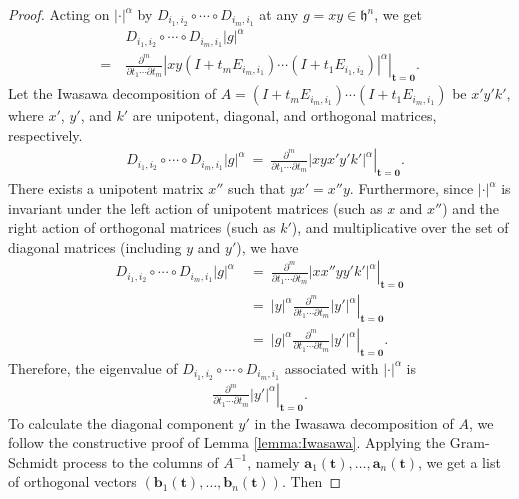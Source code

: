 \documentclass[12pt, reqno, oneside]{amsart}
\numberwithin{equation}{section}
\begin{document}
\begin{proof}
Acting on $|\cdot|^\alpha$ by $D_{i_1,i_2}\circ\cdots\circ D_{i_m,i_1}$ at any $g =xy \in \mathfrak{h}^n$, we get
\begin{align}
\nonumber
    & D_{i_1,i_2} \circ \cdots \circ D_{i_m,i_1} |g|^{\alpha} \\
    = \ & \left. \frac{\partial^m}{\partial t_1 \cdots \partial t_m} |xy(I+t_m E_{i_m,i_1}) \cdots (I+t_1E_{i_1,i_2})|^{\alpha}\right|_{\mathbf{t}=\mathbf{0}}.
\end{align}
Let the Iwasawa decomposition of $A = (I+t_mE_{i_m,i_1}) \cdots (I+t_1E_{i_m,i_1})$ be $x'y'k'$, where $x'$, $y'$, and $k'$ are unipotent, diagonal, and orthogonal matrices, respectively.
\begin{align}
    & D_{i_1,i_2}\circ\cdots\circ D_{i_m,i_1}|g|^{\alpha} \ = \ \left. \frac{\partial^m}{\partial t_1 \cdots \partial t_m}|xyx'y'k'|^{\alpha}\right|_{\mathbf{t}=\mathbf{0}}.
\end{align}
There exists a unipotent matrix $x''$ such that $yx'=x''y$. Furthermore, since $|\cdot|^\alpha$ is invariant under the left action of unipotent matrices (such as $x$ and $x''$) and the right action of orthogonal matrices (such as $k'$), and multiplicative over the set of diagonal matrices (including $y$ and $y'$), we have
\begin{align}
    \nonumber
    D_{i_1,i_2}\circ\cdots\circ D_{i_m,i_1}|g|^{\alpha} \ &= \  \left.\frac{\partial^m}{\partial t_1\cdots \partial t_m}|xx''yy'k'|^{\alpha}\right|_{\mathbf{t}=\mathbf{0}} \\
    \nonumber
    &= \ |y|^\alpha\left.\frac{\partial^m}{\partial t_1 \cdots \partial t_m}|y'|^{\alpha}\right|_{\mathbf{t}=\mathbf{0}} \\
    &= \ |g|^{\alpha}\left. \frac{\partial^m}{\partial t_1 \cdots \partial t_m}|y'|^{\alpha}\right|_{\mathbf{t}=\mathbf{0}}.
\end{align}
Therefore, the eigenvalue of $D_{i_1,i_2}\circ\cdots\circ D_{i_m,i_1}$ associated with $|\cdot|^\alpha$ is
\begin{align}\label{eq:elementary-eigenvalue-1}
\left. \frac{\partial^m}{\partial t_1 \cdots \partial t_m}|y'|^{\alpha}\right|_{\mathbf{t}=\mathbf{0}}.
\end{align}
To calculate the diagonal component $y'$ in the Iwasawa decomposition of $A$, we follow the constructive proof of Lemma \ref{lemma:Iwasawa}. Applying the Gram-Schmidt process to the columns of $A^{-1}$, namely $\mathbf{a}_1(\mathbf{t}),\dots,\mathbf{a}_n(\mathbf{t})$, we get a list of orthogonal vectors $(\mathbf{b}_1(\mathbf{t}),\dots,\mathbf{b}_n(\mathbf{t}))$. Then

\end{proof}
\end{document}
